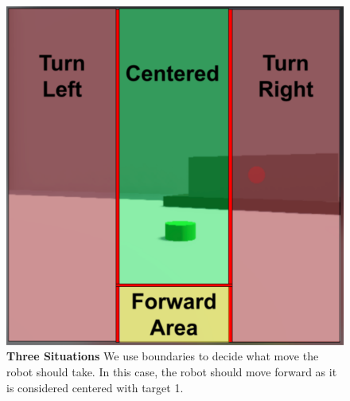 \begin{figure}[htbp]
    \centering
    \includegraphics[width=0.85\columnwidth]{figures/src/three_situations.png}
    \caption{
	    \textbf{Three Situations} We use boundaries to decide what move the robot should take. In this case, the robot should move forward as it is considered centered with target 1.
    }
    \label{fig:three_situations}
\end{figure}
